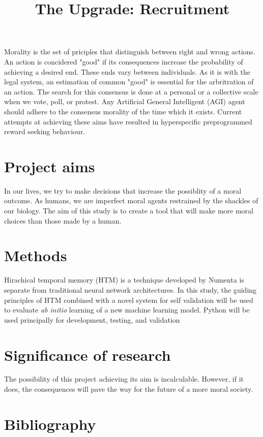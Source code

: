 \documentclass[12pt]{article}
\title{The Upgrade: Recruitment}
\date{\vspace{-5ex}}
\author{\vspace{-5ex}}
\begin{document}
\maketitle


Morality is the set of priciples that distinguish between right and wrong actions. An action is concidered "good" if its consequences increase the probability of achieving a desired end. These ends vary between individuals. As it is with the legal system, an estimation of common "good" is essential for the arbritration of an action. The search for this consensus is done at a personal or a collective scale when we vote, poll, or protest.  Any Artificial General Intelligent (AGI) agent should adhere to the consensus morality of the time which it exists. Current attempts at achieving these aims have resulted in hyperspecific preprogrammed reward seeking behaviour.

\section*{Project aims}
In our lives, we try to make decisions that increase the possiblity of a moral outcome. As humans, we are imperfect moral agents restrained by the shackles of our biology. The aim of this study is to create a tool that will make more moral choices than those made by a human. 

\section*{Methods}
Hirachical temporal memory (HTM) is a technique developed by Numenta \cite{numentahome} is separate from traditional neural network architectures.  In this study, the guiding principles of HTM combined with a novel system for self validation will be used to evaluate \emph{ab initio} learning of a new machine learning model. Python will be used principally for development, testing, and validation

\section*{Significance of research}
The possibility of this project achieving its aim is incalculable. However, if it does, the consequences will pave the way for the future of a more moral society.

\section*{Bibliography}

\end{document}
